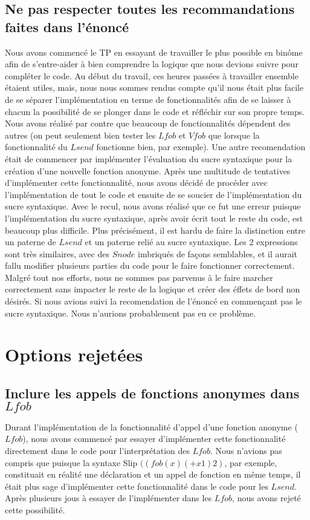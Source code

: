 \documentclass{article}
\begin{document}
	\subsection{Ne pas respecter toutes les recommandations faites dans l'énoncé}
	Nous avons commencé le TP en essayant de travailler le plus possible en binôme
	afin de s'entre-aider à bien comprendre la logique que nous devions suivre pour
	compléter le code. Au début du travail, ces heures passées à travailler ensemble
	étaient utiles, mais, nous nous sommes rendus compte qu'il nous était plus facile
	de se séparer l'implémentation en terme de fonctionnalités afin de se laisser à
	chacun la possibilité de se plonger dans le code et réfléchir sur son propre temps.
	Nous avons réalisé par contre que beaucoup de fonctionnalités dépendent des
	autres (on peut seulement bien tester les $Lfob$ et $Vfob$ que lorsque la fonctionnalité
	du $Lsend$ fonctionne bien, par exemple). Une autre recomendation était de
	commencer par implémenter l'évaluation du sucre syntaxique pour la création d'une
	nouvelle fonction anonyme. Après une multitude de tentatives d'implémenter cette
	fonctionnalité, nous avons décidé de procéder avec l'implémentation de tout
	le code et ensuite de se soucier de l'implémentation du sucre syntaxique. Avec
	le recul, nous avons réalisé que ce fut une erreur puisque l'implémentation
	du sucre syntaxique, après avoir écrit tout le reste du code, est beaucoup plus
	difficile. Plus précisément, il est hardu de faire la distinction entre un
	paterne de $Lsend$ et un paterne relié au sucre syntaxique. Les 2 expressions sont
	très similaires, avec des $Snode$ imbriqués de façons semblables, et il aurait
	fallu modifier plusieurs parties du code pour le faire fonctionner correctement.
	Malgré tout nos efforts, nous ne sommes pas parvenus à le faire marcher correctement
	sans impacter le reste de la logique et créer des éffets de bord non désirés.
	Si nous avions suivi la recomendation de l'énoncé en commençant pas le sucre
	syntaxique. Nous n'aurions probablement pas eu ce problème.
	\section{Options rejetées}
	\subsection{Inclure les appels de fonctions anonymes dans $Lfob$}
	Durant l'implémentation de la fonctionnalité d'appel d'une fonction anonyme ($L
	fob$), nous avons commencé par essayer d'implémenter cette fonctionnalité directement
	dans le code pour l'interprétation des $Lfob$. Nous n'avions pas compris que
	puisque la syntaxe Slip $((fob (x)(+ x 1)2)$, par exemple, constituait en
	réalité une déclaration et un appel de fonction en même temps, il était plus sage
	d'implémenter cette fonctionnalité dans le code pour les $Lsend$. Après
	plusieurs jous à essayer de l'implémenter dans les $Lfob$, nous avons rejeté cette
	possibilité.
\end{document}
